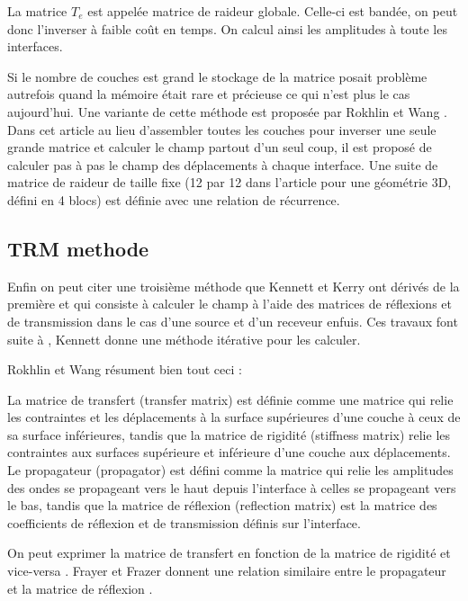 La matrice $T_e$ est appelée matrice de raideur globale. Celle-ci est bandée, on peut donc l'inverser à faible coût en temps. On calcul ainsi les amplitudes à toute les interfaces. \par 

Si le nombre de couches est grand le stockage de la matrice posait problème autrefois quand la mémoire était rare et précieuse ce qui n'est plus le cas aujourd'hui. Une variante de cette méthode est proposée par Rokhlin et Wang \cite{Rokhlin_Wang}. Dans cet article au lieu d'assembler toutes les couches pour inverser une seule grande matrice et calculer le champ partout d'un seul coup, il est proposé de calculer pas à pas le champ des déplacements à chaque interface. Une suite de matrice de raideur de taille fixe (12 par 12 dans l'article pour une géométrie 3D, défini en 4 blocs) est définie avec une relation de récurrence.






\subsection{TRM methode}

Enfin on peut citer une troisième méthode que Kennett et Kerry ont dérivés de la première et qui consiste à calculer le champ à l'aide des matrices de réflexions et de transmission \cite{Kennett_Kerry} dans le cas d'une source et d'un receveur enfuis. Ces travaux font suite à \cite{Kennett1974}, Kennett donne une méthode itérative pour les calculer. \par 




Rokhlin et Wang résument bien tout ceci \cite{Rokhlin_Wang}:\par 
La matrice de transfert (transfer matrix) est définie comme une matrice qui relie les contraintes et les déplacements à la surface supérieures d'une couche à ceux de sa surface inférieures, tandis que la matrice de rigidité (stiffness matrix) relie les contraintes aux surfaces supérieure et inférieure d'une couche aux déplacements. Le propagateur (propagator) est défini comme la matrice qui relie les amplitudes des ondes se propageant vers le haut depuis l'interface à celles se propageant vers le bas, tandis que la matrice de réflexion (reflection matrix) est la matrice des coefficients de réflexion et de transmission définis sur l'interface.\par  
On peut exprimer la matrice de transfert en fonction de la matrice de rigidité et vice-versa \cite{Rokhlin_Wang}. Frayer et Frazer donnent une relation similaire entre le propagateur et la matrice de réflexion \cite{Fryer_Frazer}.

